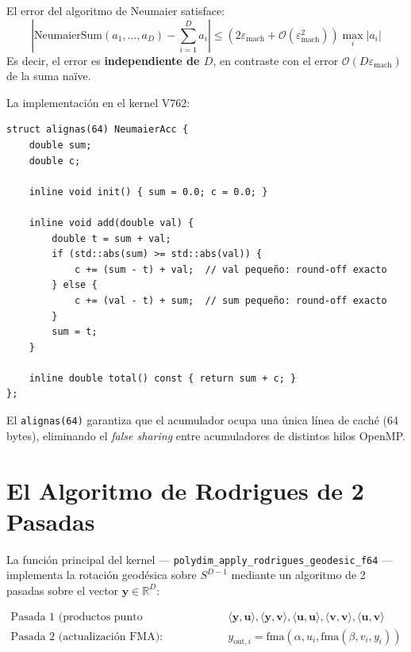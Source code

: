 \begin{theorem}

El error del algoritmo de Neumaier satisface:
\begin{equation}
\left|\text{NeumaierSum}(a_1, \ldots, a_D) - \sum_{i=1}^D a_i\right| \le (2\varepsilon_{\text{mach}} + \mathcal{O}(\varepsilon_{\text{mach}}^2)) \max_i |a_i|
\end{equation}
Es decir, el error es \textbf{independiente de $D$}, en contraste con el error $\mathcal{O}(D\varepsilon_{\text{mach}})$ de la suma naïve.
\end{theorem}

La implementación en el kernel V762:

\begin{verbatim}
struct alignas(64) NeumaierAcc {
    double sum;
    double c;

    inline void init() { sum = 0.0; c = 0.0; }

    inline void add(double val) {
        double t = sum + val;
        if (std::abs(sum) >= std::abs(val)) {
            c += (sum - t) + val;  // val pequeño: round-off exacto
        } else {
            c += (val - t) + sum;  // sum pequeño: round-off exacto
        }
        sum = t;
    }

    inline double total() const { return sum + c; }
};
\end{verbatim}

El \texttt{alignas(64)} garantiza que el acumulador ocupa una única línea de caché
(64 bytes), eliminando el \textit{false sharing} entre acumuladores de distintos hilos OpenMP.

\section{El Algoritmo de Rodrigues de 2 Pasadas}

La función principal del kernel --- \texttt{polydim\_apply\_rodrigues\_geodesic\_f64}
--- implementa la rotación geodésica sobre $S^{D-1}$ mediante un algoritmo de
2 pasadas sobre el vector $\mathbf{y} \in \mathbb{R}^D$:

\begin{align}
\text{Pasada 1 (productos punto compensados):} &\quad
\langle\mathbf{y}, \mathbf{u}\rangle, \langle\mathbf{y}, \mathbf{v}\rangle,
\langle\mathbf{u}, \mathbf{u}\rangle, \langle\mathbf{v}, \mathbf{v}\rangle,
\langle\mathbf{u}, \mathbf{v}\rangle \\
\text{Pasada 2 (actualización FMA):} &\quad
y_{\text{out},i} = \text{fma}(\alpha, u_i, \text{fma}(\beta, v_i, y_i))
\end{align}

